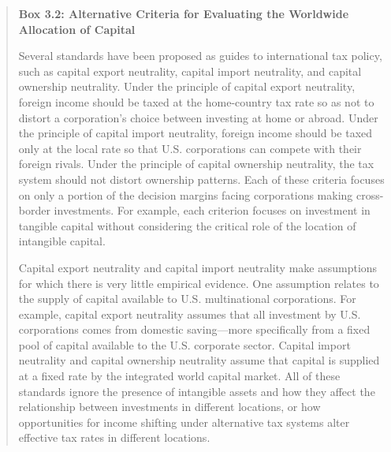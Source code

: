 \begin{select}
\begin{framed} 
\begin{quote}
\textbf{Box 3.2:  Alternative Criteria for Evaluating the Worldwide Allocation of Capital} 
 
Several standards have been proposed as guides to international tax policy, such 
as capital export neutrality, capital import neutrality, and capital ownership neutrality.  
Under the principle of capital export neutrality, foreign income should be taxed at the 
home-country tax rate so as not to distort a corporation's choice between investing at 
home or abroad.  Under the principle of capital import neutrality, foreign income should 
be taxed only at the local rate so that U.S. corporations can compete with their foreign 
rivals.  Under the principle of capital ownership neutrality, the tax system should not 
distort ownership patterns.  Each of these criteria focuses on only a portion of the 
decision margins facing corporations making cross-border investments.  For example, 
each criterion focuses on investment in tangible capital without considering the critical 
role of the location of intangible capital. 
 
Capital export neutrality and capital import neutrality make assumptions for 
which there is very little empirical evidence.  One assumption relates to the supply of 
capital available to U.S. multinational corporations.  For example, capital export 
neutrality assumes that all investment by U.S. corporations comes from domestic saving---more specifically from a fixed pool of capital available to the U.S. corporate sector.  
Capital import neutrality and capital ownership neutrality assume that capital is supplied 
at a fixed rate by the integrated world capital market.  All of these standards ignore the 
presence of intangible assets and how they affect the relationship between investments in 
different locations, or how opportunities for income shifting under alternative tax systems 
alter effective tax rates in different locations. 
 

\end{quote}
\end{framed}
\end{select}
